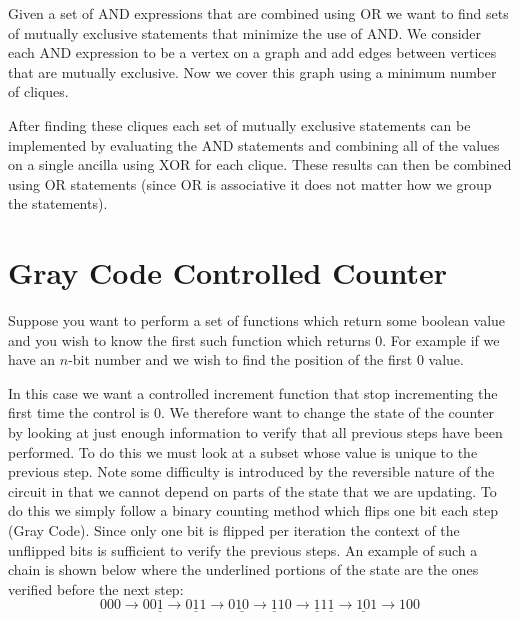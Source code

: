 Given a set of AND expressions that are combined using OR we want to find sets of mutually exclusive statements that minimize the use of AND.
We consider each AND expression to be a vertex on a graph and add edges between vertices that are mutually exclusive.
Now we cover this graph using a minimum number of cliques.

After finding these cliques each set of mutually exclusive statements can be implemented by evaluating the AND statements and combining all of the values on a single ancilla using XOR for each clique.
These results can then be combined using OR statements (since OR is associative it does not matter how we group the statements).


\section{Gray Code Controlled Counter\label{sec:findFirst}}
  Suppose you want to perform a set of functions which return some boolean value and you wish to know the first such function which returns $0$.
  For example if we have an $n$-bit number and we wish to find the position of the first $0$ value.

  In this case we want a controlled increment function that stop incrementing the first time the control is $0$.
  We therefore want to change the state of the counter by looking at just enough information to verify that all previous steps have been performed.
  To do this we must look at a subset whose value is unique to the previous step.
  Note some difficulty is introduced by the reversible nature of the circuit in that we cannot depend on parts of the state that we are updating.
  To do this we simply follow a binary counting method which flips one bit each step (Gray Code).
  Since only one bit is flipped per iteration the context of the unflipped bits is sufficient to verify the previous steps.
  An example of such a chain is shown below where the underlined portions of the state are the ones verified before the next step:
  \[
    000 \to 00\underline{1} \to 0\underline{1}1 \to 0\underline{10} \to \underline{1}10 \to
    \underline{1}1\underline{1} \to \underline{10}1 \to 100
  \]
